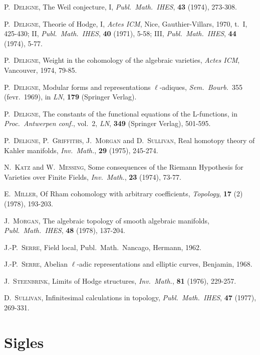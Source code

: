 \documentclass[12pt,a4paper]{article}
\theoremstyle{plain}
\theoremstyle{definition}
\theoremstyle{remark}
\begin{document}
\begin{enumerate}[label={[\arabic*]}]
\item P.\ \textsc{Deligne}, The Weil conjecture, I, \textit{Publ.\ Math.\ IHES}, \textbf{43} (1974), 273-308.
\item P.\ \textsc{Deligne}, Theorie of Hodge, I, \textit{Actes ICM}, Nice, Gauthier-Villars, 1970, t.\ I, 425-430; II, \textit{Publ.\ Math.\ IHES}, \textbf{40} (1971), 5-58; III, \textit{Publ.\ Math.\ IHES}, \textbf{44} (1974), 5-77.
\item P.\ \textsc{Deligne}, Weight in the cohomology of the algebraic varieties, \textit{Actes ICM}, Vancouver, 1974, 79-85.
\item P.\ \textsc{Deligne}, Modular forms and representations $\ell$-adiques, \textit{Sem.\ Bourb.}\ 355 (fevr.\ 1969), in \textit{LN}, \textbf{179} (Springer Verlag).
\item P.\ \textsc{Deligne}, The constants of the functional equations of the L-functions, in \textit{Proc.\ Antwerpen conf.}, vol.\ 2, \textit{LN}, \textbf{349} (Springer Verlag), 501-595.
\item P.\ \textsc{Deligne}, P.\ \textsc{Griffiths}, J.\ \textsc{Morgan} and D.\ \textsc{Sullivan}, Real homotopy theory of Kahler manifolds, \textit{Inv.\ Math.}, \textbf{29} (1975), 245-274.
\item N.\ \textsc{Katz} and W.\ \textsc{Messing}, Some consequences of the Riemann Hypothesis for Varieties over Finite Fields, \textit{Inv.\ Math.}, \textbf{23} (1974), 73-77.
\item E.\ \textsc{Miller}, Of Rham cohomology with arbitrary coefficients, \textit{Topology}, \textbf{17} (2) (1978), 193-203.
\item J.\ \textsc{Morgan}, The algebraic topology of smooth algebraic manifolds, \textit{Publ.\ Math.\ IHES}, \textbf{48} (1978), 137-204.
\item J.-P.\ \textsc{Serre}, Field local, Publ.\ Math.\ Nancago, Hermann, 1962.
\item J.-P.\ \textsc{Serre}, Abelian $\ell$-adic representations and elliptic curves, Benjamin, 1968.
\item J.\ \textsc{Steenbrink}, Limits of Hodge structures, \textit{Inv.\ Math.}, \textbf{81} (1976), 229-257.
\item D.\ \textsc{Sullivan}, Infinitesimal calculations in topology, \textit{Publ.\ Math.\ IHES}, \textbf{47} (1977), 269-331.
\end{enumerate}

\section*{Sigles}
\end{document}
